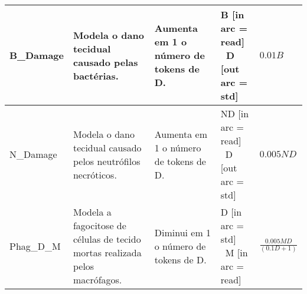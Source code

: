 \begin{center}
\begin{longtable}{
				>{\centering\arraybackslash}m{2cm}|
				m{4.23cm}|
				>{\centering\arraybackslash}m{3cm}|
				m{3cm}|
				>{\centering\arraybackslash}m{2.5cm}
			}
			B\_Damage & 
			Modela o dano tecidual causado pelas bactérias. & 
			Aumenta em 1 o número de tokens de D. & 
			\parbox{3cm}{B [in arc = read]\\\ D [out arc = std]} & 
			$0.01 B$ \\ \hline
			
			N\_Damage & 
			Modela o dano tecidual causado pelos neutrófilos necróticos. & 
			Aumenta em 1 o número de tokens de D. & 
			\parbox{3cm}{ND [in arc = read]\\\ D [out arc = std]} & 
			$0.005 ND$ \\ \hline
			
			Phag\_D\_M & 
			Modela a fagocitose de células de tecido mortas realizada pelos macrófagos. & 
			Diminui em 1 o número de tokens de D. & 
			\parbox{3cm}{D [in arc = std]\\\ M [in arc = read]} & 
			$\frac{0.005 M D}{(0.1 D + 1)}$ \\
			
		\end{longtable}
	\end{center}
\endgroup



